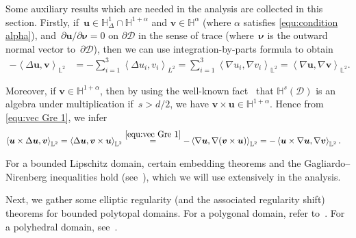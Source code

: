 \documentclass[11pt,reqno]{amsart}
\theoremstyle{definition}
\numberwithin{equation}{section}
\newcommand{\bff}{\boldsymbol}
\newcommand{\bb}{\mathbb}
\newcommand{\pa}{\partial}
\newcommand{\inpro}[2]{\left\langle#1,#2\right\rangle}
\begin{document}
Some auxiliary results which are needed in the analysis are collected in this section.
Firstly, if~$\bff{u}\in \bb{H}^1_\Delta \cap \bb{H}^{1+\alpha}$ and $\bff{v}\in \bb{H}^{\alpha}$ (where $\alpha$ satisfies \eqref{equ:condition alpha}),
and~$\pa \bff{u}/\pa\bff{\nu}=0$ on $\pa\mathscr{D}$ in the sense of trace (where~$\bff{\nu}$ is the outward normal vector
to~$\pa \mathscr{D}$), then we can use integration-by-parts formula to obtain
\begin{align}\label{equ:vec Gre 1}
		-\inpro{\Delta\bff{u}}{\bff{v}}_{\bb{L}^2}
		&=
		-\sum_{i=1}^3
		\inpro{\Delta u_i}{v_i}_{L^2}
		=
		\sum_{i=1}^3
		\inpro{\nabla u_i}{\nabla v_i}_{\bb{L}^2}
		=
		\inpro{\nabla\bff{u}}{\nabla\bff{v}}_{\bb{L}^2}.
\end{align}

Moreover, if $\bff{v}\in\bb{H}^{1+\alpha}$, then by using the well-known fact~\citep{BreMir01} that $\bb{H}^s(\mathscr{D})$ is an algebra under multiplication if~$s>d/2$, we have $\bff{v}\times\bff{u}\in \bb{H}^{1+\alpha}$. Hence from \eqref{equ:vec Gre 1}, we infer
\begin{align}
        \label{equ:vec Gre 2}
		\inpro{\bff{u}\times\Delta\bff{u}}{\bff{v}}_{\bb{L}^2}
		&=
		\inpro{\Delta\bff{u}}{\bff{v}\times\bff{u}}_{\bb{L}^2}
		\stackrel{\eqref{equ:vec Gre 1}}{=}
		-
		\inpro{\nabla\bff{u}}{\nabla(\bff{v}\times\bff{u})}_{\bb{L}^2}
		=
		-
		\inpro{\bff{u}\times\nabla\bff{u}}{\nabla\bff{v}}_{\bb{L}^2}.
\end{align}

For a bounded Lipschitz domain, certain embedding theorems and the Gagliardo--Nirenberg inequalities hold (see~\citep{BreMir18, BreMir19, DiPalVal12}), which we will use extensively in the analysis.

Next, we gather some elliptic regularity (and the associated regularity shift) theorems for bounded polytopal domains. For a polygonal domain, refer to~\citep{Dau92, Li22}. For a polyhedral domain, see~\citep{Dau92, JerKen89}.
\end{document}
